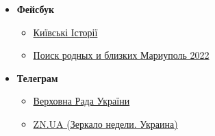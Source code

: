 \begin{itemize}
\item \textbf{Фейсбук}

\begin{itemize}
\item \href{https://www.facebook.com/groups/story.kiev.ua}{Київські Історії}
\end{itemize}

\begin{itemize} %
\item \href{https://www.facebook.com/groups/findmariupol}{Поиск родных и близких Мариуполь 2022}
\end{itemize} %

\item \textbf{Телеграм}

\begin{itemize}
\item \href{https://t.me/verkhovnaradaofukraine}{Верховна Рада України}
\item \href{https://t.me/znua_live}{ZN.UA (Зеркало недели. Украина)}
\end{itemize}


\end{itemize}
